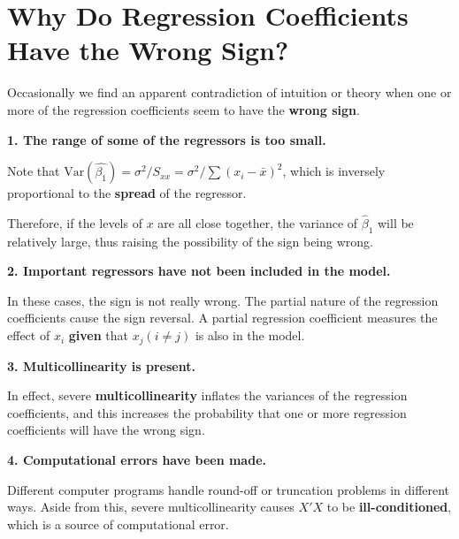 \documentclass[12pt]{article}
\begin{document}
\section{Why Do Regression Coefficients Have the Wrong Sign?}

Occasionally we find an apparent contradiction of intuition or theory when one or more of the regression coefficients seem to have the \textbf{wrong sign}. 

\bigskip
\textbf{1. The range of some of the regressors is too small.}

Note that $\mathrm{Var} (\hat{\beta_1}) = \sigma^2/S_{xx} = \sigma^2/\sum(x_i - \bar{x})^2$, which is inversely proportional to the \textbf{spread} of the regressor. 

Therefore, if the levels of $x$ are all close together, the variance of $\hat{\beta}_1$ will be relatively large, thus raising the possibility of the sign being wrong. 

\bigskip
\textbf{2. Important regressors have not been included in the model.}

In these cases, the sign is not really wrong. The partial nature of the regression coefficients cause the sign reversal. A partial regression coefficient measures the effect of $x_i$ \textbf{given} that $x_j (i \neq j)$ is also in the model. 


\bigskip
\textbf{3. Multicollinearity is present.}

In effect, severe \textbf{multicollinearity} inflates the variances of the regression coefficients, and this increases the probability that one or more regression coefficients will have the wrong sign. 


\bigskip
\textbf{4. Computational errors have been made.}

Different computer programs handle round-off or truncation problems in different ways. Aside from this, severe multicollinearity causes $X'X$ to be \textbf{ill-conditioned}, which is a source of computational error. 



\pagebreak




\pagebreak
\end{document}
